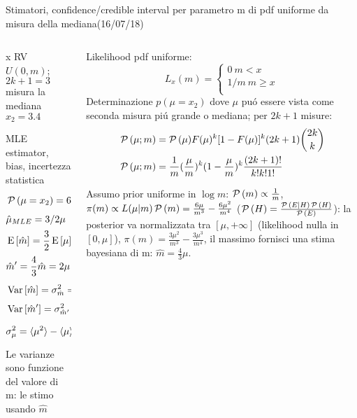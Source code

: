 \begin{wordonframe}{Stimatori, confidence/credible interval per parametro m di pdf uniforme da misura della mediana(16/07/18)}
\begin{columns}[T]\begin{column}{0.5\textwidth}
x RV $U(0,m)$; $2k+1=3$ misura la mediana $x_2=3.4$
\begin{block}{MLE estimator, bias, incertezza statistica}
\begin{align*}
&\operatorname{\mathcal{P}}{(\mu=x_2)}=6\frac{\mu}{m^2}(1-\frac{\mu}{m})\\
&\hat{\mu}_{MLE}=3/2\mu\\
&\operatorname{E}{[\hat{m}]}=\frac{3}{2}\operatorname{E}{[\mu]}\frac{3}{2}\int_0^{m}\mu\operatorname{\mathcal{P}}{(\mu)}\,d\mu=\frac{3}{4}m\\
&\hat{m}'=\frac{4}{3}\hat{m}=2\mu\\
&\operatorname{Var}{[\hat{m}]}=\sigma^2_{\hat{m}}=\frac{9}{4}\operatorname{Var}{\mu}=\frac{9}{4}\sigma_{\mu}^2\\
&\operatorname{Var}{[\hat{m}']}=\sigma^2_{\hat{m}'}=4\operatorname{Var}{\mu}=4\sigma_{\mu}^2\\
&\sigma^2_{\mu}=\langle \mu^2 \rangle-\langle \mu \rangle^2=\frac{m^2}{20}
\end{align*}
Le varianze sono funzione del valore di m: le stimo usando $\hat{m}$
\end{block}
\end{column}\begin{column}{0.5\textwidth}
Likelihood pdf uniforme: \begin{equation*}L_x(m)=\left\{\begin{array}{c}
0\ m<x\\
1/m\ m\geq x\\
\end{array}
\end{equation*}
Determinazione $p(\mu=x_2)$ dove $\mu$ pu\'o essere vista come seconda misura pi\'u grande o mediana; per $2k+1$ misure:
\begin{align*}
&\operatorname{\mathcal{P}}{(\mu;m)}=\operatorname{\mathcal{P}}{(\mu)}F(\mu)^k[1-F(\mu)]^k(2k+1)\binom{2k}{k}\\
&\operatorname{\mathcal{P}}{(\mu;m)}=\frac{1}{m}(\frac{\mu}{m})^k(1-\frac{\mu}{m})^k\frac{(2k+1)!}{k!k!1!}
\end{align*}
\begin{block}{}
Assumo prior uniforme in $\log{m}$: $\operatorname{\mathcal{P}}{(m)}\propto\frac{1}{m}$,  $\pi(m)\propto L(\mu|m)\operatorname{\mathcal{P}}{(m)}=\frac{6\mu}{m^3}-\frac{6\mu^2}{m^4}$ ($\operatorname{\mathcal{P}}{(H)}=\frac{\operatorname{\mathcal{P}}{(E|H)\operatorname{\mathcal{P}}{(H)}}}{\operatorname{\mathcal{P}}{(E)}}$): la posterior va normalizzata tra $[\mu,+\infty]$ (likelihood nulla  in $[0,\mu]$), $\pi(m)=\frac{3\mu^2}{m^3}-\frac{3\mu^3}{m^4}$, il massimo fornisci una stima bayesiana di m: $\hat{m}=\frac{4}{3}\mu$.
\end{block}


\end{column}
\end{columns}
\end{wordonframe}
